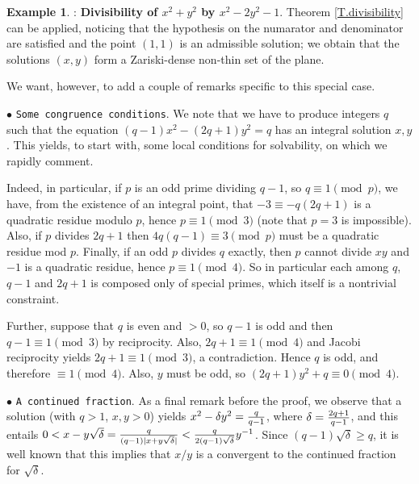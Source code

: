 \documentclass[leqno,12pt]{article} %
\theoremstyle{plain} %
\theoremstyle{definition} %
\newtheorem{example}[theorem]{\indent\sc Example}
\begin{document}
 
\begin{example}\label{EX.3}: {\bf Divisibility of $x^2+y^2$ by $x^2-2y^2-1$}.  Theorem \ref{T.divisibility} can be applied, noticing that the hypothesis on the numarator and denominator are satisfied and the point $(1,1) $ is an admissible solution; we obtain that the solutions $(x,y)$ form a Zariski-dense non-thin set of the plane.

We want, however, to add a couple of remarks specific to this special case.

\smallskip

$\bullet$ {\tt   Some congruence conditions}. We note that we have to produce integers $q$ such that
the equation  $(q-1)x^2-(2q+1)y^2=q$ has an integral solution $x,y$.  This yields, to start with, some local conditions for solvability, on which we rapidly comment. %

Indeed,  in particular, if $p$ is an odd prime dividing $q-1$, so $q\equiv 1\pmod p$, we have, from the existence of an integral point, that $-3\equiv -q(2q+1)$ is a quadratic residue modulo $p$, hence $p\equiv 1\pmod 3$  (note that $p=3$ is impossible). Also, if $p$ divides $2q+1$ then $4q(q-1)\equiv 3\pmod p$ must be  a quadratic residue mod $p$.  Finally, if an odd  $p$ divides $q$ exactly, then $p$ cannot divide $xy$ and $-1$ is a quadratic residue, hence $p\equiv 1\pmod 4$.  So in particular each among  $q$, $q-1$ and $2q+1$ is  composed   only of special primes, which itself is a nontrivial constraint. 

Further, suppose  that $q$ is even and $>0$,  so  $q-1$ is odd and then $q-1\equiv 1\pmod 3$ by reciprocity. Also, $2q+1\equiv 1\pmod 4$ and Jacobi reciprocity yields $2q+1\equiv 1\pmod 3$, a contradiction. Hence $q$ is odd, and therefore $\equiv 1\pmod 4$. Also, $y$ must be odd, so $(2q+1)y^2+q\equiv 0\pmod 4$. 




\smallskip

 

$\bullet$  {\tt A continued fraction}. As a final remark before the proof, we observe that a solution  (with $q>1$, $x,y>0$) yields $x^2-\delta y^2={q\over q-1}$, where $\delta ={2q+1\over q-1}$, and this entails 
$0<x-y\sqrt\delta={q\over (q-1)|x+y\sqrt\delta|}<{q\over 2(q-1)\sqrt\delta}y^{-1}$. Since $(q-1)\sqrt\delta\ge q$, it is well known that this implies that $x/y$ is a convergent to the continued fraction for $\sqrt\delta$. 

\medskip

 

\end{example}
\end{document}
